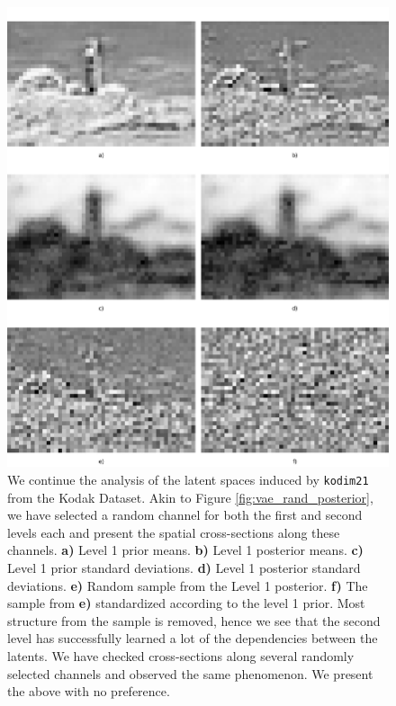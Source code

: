 \documentclass{article}
\begin{document}
\begin{figure}
  \centering
  \includegraphics[width=\textwidth]{../img/plots/vae_latents/ladder_rand_posterior}
  \caption{We continue the analysis of the latent spaces induced by
    \texttt{kodim21} from the Kodak Dataset. Akin to Figure
    \ref{fig:vae_rand_posterior}, we have selected a random channel for both the
    first and second levels each and present the spatial cross-sections along these
    channels. \textbf{a)} Level 1 prior means. \textbf{b)} Level 1 posterior means.
    \textbf{c)} Level 1 prior standard deviations. \textbf{d)} Level 1 posterior
    standard deviations. \textbf{e)} Random sample from the Level 1 posterior.
    \textbf{f)} The sample from \textbf{e)} standardized according to the level
    1 prior. Most structure from the sample is removed, hence we see that the
    second level has successfully learned a lot of the dependencies between the
    latents. We have checked cross-sections along several randomly selected
    channels and observed the same phenomenon. We present the above with no preference.}
  \label{fig:ladder_rand_posterior}
\end{figure}
\end{document}
